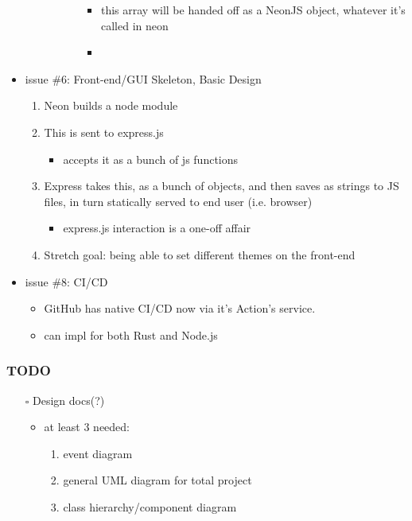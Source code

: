 \documentclass[11pt]{article}
\begin{document}
\begin{itemize}
\begin{itemize}
\begin{itemize}
\begin{itemize}
\begin{itemize}
\item this array will be handed off as a NeonJS object, whatever it's called in neon
\item 
\end{itemize}
\end{itemize}
\end{itemize}
\end{itemize}
\item issue \#6: Front-end/GUI Skeleton, Basic Design
\label{sec:org5980962}
\begin{enumerate}
\item Neon builds a node module
\item This is sent to express.js
\begin{itemize}
\item accepts it as a bunch of js functions
\end{itemize}
\item Express takes this, as a bunch of objects, and then saves as strings to JS files, in turn
statically served to end user (i.e. browser)
\begin{itemize}
\item express.js interaction is a one-off affair
\end{itemize}
\item Stretch goal: being able to set different themes on the front-end
\end{enumerate}
\item issue \#8: CI/CD
\label{sec:org072518a}
\begin{itemize}
\item GitHub has native CI/CD now via it's Action's service.
\item can impl for both Rust and Node.js
\end{itemize}
\end{itemize}
\subsubsection*{{\bfseries\sffamily TODO} }
\label{sec:org74c69f3}
\begin{itemize}
\item[{$\square$}] Design docs(?)
\begin{itemize}
\item at least 3 needed:
\begin{enumerate}
\item event diagram
\item general UML diagram for total project
\item class hierarchy/component diagram
\end{enumerate}
\end{itemize}
\end{itemize}
\end{document}
